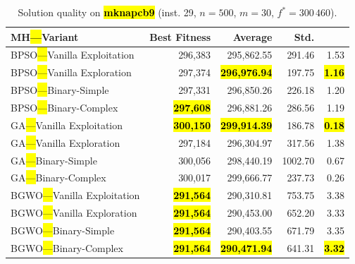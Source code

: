 \documentclass[mathematics,article,accept,moreauthors]{Definitions/mdpi}
\begin{document}
\begin{table}[H]
  \small
  \caption{Solution quality on \textbf{\hl{mknapcb9}} (inst. 29, $n=500$, $m=30$, $f^*=300\,460$).}
  \label{tab:calidad_mknapcb9_29}
  \begin{tabularx}{\textwidth}{lRRRR}
    \toprule
    \textbf{MH\hl{---}Variant} &
    \textbf{Best Fitness} &
    \textbf{Average} &
    \textbf{Std.} &
    \textbf{} \\
    \midrule
    BPSO\hl{---}Vanilla Exploitation &         296,383 &        295,862.55 & 291.46 &         1.53 \\
    BPSO\hl{---}Vanilla Exploration  &         297,374 & \textbf{\hl{296,976.94}} & 197.75 & \textbf{\hl{1.16}} \\
    BPSO\hl{---}Binary-Simple        &         297,331 &        296,850.26 & 226.18 &         1.20 \\
    BPSO\hl{---}Binary-Complex       & \textbf{\hl{297,608}} &        296,881.26 & 286.56 &         1.19 \\
    \midrule
    GA\hl{---}Vanilla Exploitation   & \textbf{\hl{300,150}} & \textbf{\hl{299,914.39}} & 186.78 & \textbf{\hl{0.18}} \\
    GA\hl{---}Vanilla Exploration    &         297,184 &        296,304.97 & 317.56 &         1.38 \\
    GA\hl{---}Binary-Simple          &         300,056 &        298,440.19 & 1002.70 &         0.67 \\
    GA\hl{---}Binary-Complex         &         300,017 &        299,666.77 & 237.73 &         0.26 \\
    \midrule
    BGWO\hl{---}Vanilla Exploitation & \textbf{\hl{291,564}} &        290,310.81 & 753.75 &         3.38 \\
    BGWO\hl{---}Vanilla Exploration  & \textbf{\hl{291,564}} &        290,453.00 & 652.20 &         3.33 \\
    BGWO\hl{---}Binary-Simple        & \textbf{\hl{291,564}} &        290,403.55 & 671.79 &         3.35 \\
    BGWO\hl{---}Binary-Complex       & \textbf{\hl{291,564}} & \textbf{\hl{290,471.94}} & 641.31 & \textbf{\hl{3.32}} \\


\bottomrule
\end{tabularx} %
\end{table}
\end{document}
